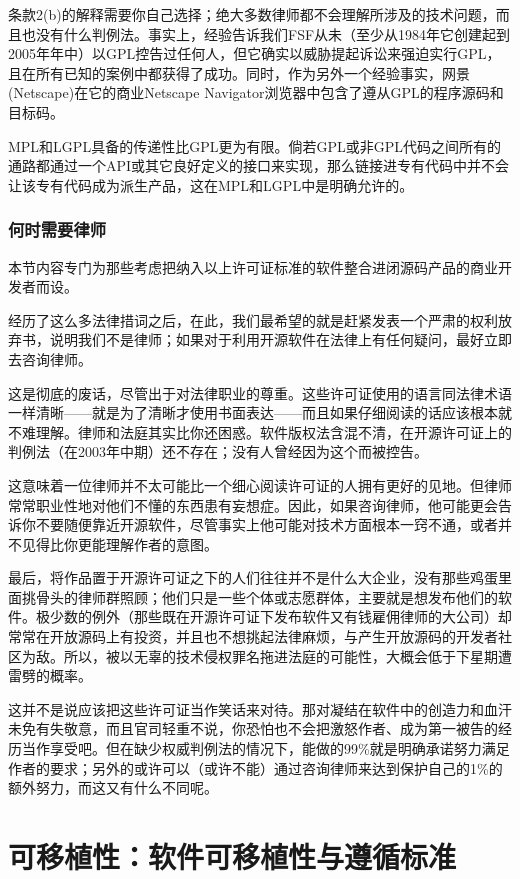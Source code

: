 \documentclass[12pt,oneside]{book}
\begin{document}
\begin{common-format}
条款2(b)的解释需要你自己选择；绝大多数律师都不会理解所涉及的技术问题，而且也没有什么判例法。事实上，经验告诉我们FSF从未（至少从1984年它创建起到2005年年中）以GPL控告过任何人，但它确实以威胁提起诉讼来强迫实行GPL，且在所有已知的案例中都获得了成功。同时，作为另外一个经验事实，网景(Netscape)在它的商业Netscape Navigator浏览器中包含了遵从GPL的程序源码和目标码。

MPL和LGPL具备的传递性比GPL更为有限。倘若GPL或非GPL代码之间所有的通路都通过一个API或其它良好定义的接口来实现，那么链接进专有代码中并不会让该专有代码成为派生产品，这在MPL和LGPL中是明确允许的。

\subsection{何时需要律师}
本节内容专门为那些考虑把纳入以上许可证标准的软件整合进闭源码产品的商业开发者而设。

经历了这么多法律措词之后，在此，我们最希望的就是赶紧发表一个严肃的权利放弃书，说明我们不是律师；如果对于利用开源软件在法律上有任何疑问，最好立即去咨询律师。

这是彻底的废话，尽管出于对法律职业的尊重。这些许可证使用的语言同法律术语一样清晰——就是为了清晰才使用书面表达——而且如果仔细阅读的话应该根本就不难理解。律师和法庭其实比你还困惑。软件版权法含混不清，在开源许可证上的判例法（在2003年中期）还不存在；没有人曾经因为这个而被控告。

这意味着一位律师并不太可能比一个细心阅读许可证的人拥有更好的见地。但律师常常职业性地对他们不懂的东西患有妄想症。因此，如果咨询律师，他可能更会告诉你不要随便靠近开源软件，尽管事实上他可能对技术方面根本一窍不通，或者并不见得比你更能理解作者的意图。

最后，将作品置于开源许可证之下的人们往往并不是什么大企业，没有那些鸡蛋里面挑骨头的律师群照顾；他们只是一些个体或志愿群体，主要就是想发布他们的软件。极少数的例外（那些既在开源许可证下发布软件又有钱雇佣律师的大公司）却常常在开放源码上有投资，并且也不想挑起法律麻烦，与产生开放源码的开发者社区为敌。所以，被以无辜的技术侵权罪名拖进法庭的可能性，大概会低于下星期遭雷劈的概率。

这并不是说应该把这些许可证当作笑话来对待。那对凝结在软件中的创造力和血汗未免有失敬意，而且官司轻重不说，你恐怕也不会把激怒作者、成为第一被告的经历当作享受吧。但在缺少权威判例法的情况下，能做的99\%{}就是明确承诺努力满足作者的要求；另外的或许可以（或许不能）通过咨询律师来达到保护自己的1\%{}的额外努力，而这又有什么不同呢。


\chapter{可移植性：软件可移植性与遵循标准}



\end{common-format}
\end{document}
